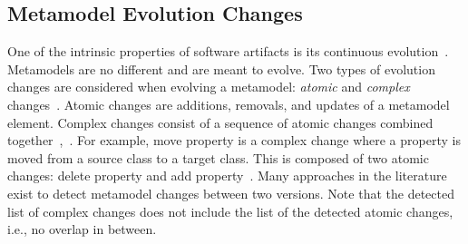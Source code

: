 \subsection{Metamodel Evolution Changes}
\label{mmchanges}

One of the intrinsic properties of software artifacts is its continuous evolution~\cite{mens2008introduction}. Metamodels are no different and are meant to evolve. 
Two types of evolution changes are considered when evolving a metamodel: \emph{atomic} and \emph{complex} changes~\cite{Herrmannsdoerfer2011}. 
Atomic changes are additions, removals, and updates of a metamodel element. Complex changes consist of a sequence of atomic changes combined together~\cite{vermolen_reconstructing_2012},~\cite{khelladi2015detecting}. For example, move property is a complex change where a property is moved from a source class to a target class. This is composed of two atomic changes: delete property and add property~\cite{Herrmannsdoerfer2011}. 
Many approaches in the literature~\cite{Alter2015, williams2012searching,cicchetti_managing_2009,langer_posteriori_2013,vermolen_reconstructing_2012,Khelladi2016,bettini2022executable} exist to detect metamodel changes between two versions. Note that the detected list of complex changes does not include the list of the detected atomic changes, i.e., no overlap in between. 

